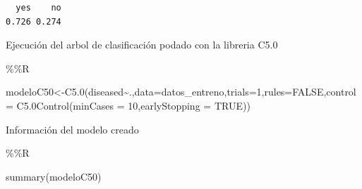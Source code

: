 \documentclass[
  11pt,
  a4paper,
]{article}
\newenvironment{Shaded}{\begin{snugshade}}{\end{snugshade}}
\newcommand{\AttributeTok}[1]{\textcolor[rgb]{0.77,0.63,0.00}{#1}}
\newcommand{\ConstantTok}[1]{\textcolor[rgb]{0.00,0.00,0.00}{#1}}
\newcommand{\DecValTok}[1]{\textcolor[rgb]{0.00,0.00,0.81}{#1}}
\newcommand{\FunctionTok}[1]{\textcolor[rgb]{0.00,0.00,0.00}{#1}}
\newcommand{\NormalTok}[1]{#1}
\newcommand{\OtherTok}[1]{\textcolor[rgb]{0.56,0.35,0.01}{#1}}
\newcommand{\SpecialCharTok}[1]{\textcolor[rgb]{0.00,0.00,0.00}{#1}}
\begin{document}
\begin{verbatim}
  yes    no 
0.726 0.274 
\end{verbatim}

Ejecución del arbol de clasificación podado con la libreria C5.0

\begin{Shaded}
\begin{Highlighting}[]
\SpecialCharTok{\%\%}\NormalTok{R}


\NormalTok{modeloC50}\OtherTok{\textless{}{-}}\FunctionTok{C5.0}\NormalTok{(diseased}\SpecialCharTok{\textasciitilde{}}\NormalTok{.,}\AttributeTok{data=}\NormalTok{datos\_entreno,}\AttributeTok{trials=}\DecValTok{1}\NormalTok{,}\AttributeTok{rules=}\ConstantTok{FALSE}\NormalTok{,}\AttributeTok{control =} \FunctionTok{C5.0Control}\NormalTok{(}\AttributeTok{minCases =} \DecValTok{10}\NormalTok{,}\AttributeTok{earlyStopping =} \ConstantTok{TRUE}\NormalTok{))}
\end{Highlighting}
\end{Shaded}

Información del modelo creado

\begin{Shaded}
\begin{Highlighting}[]
\SpecialCharTok{\%\%}\NormalTok{R}

\FunctionTok{summary}\NormalTok{(modeloC50)}
\end{Highlighting}
\end{Shaded}
\end{document}
